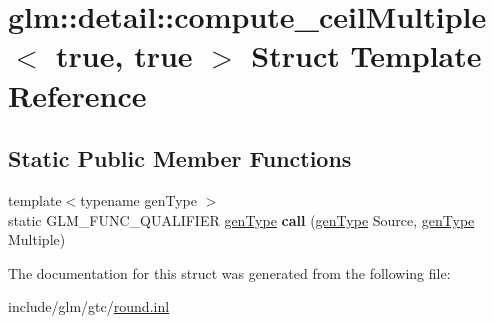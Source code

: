 \hypertarget{structglm_1_1detail_1_1compute__ceilMultiple_3_01true_00_01true_01_4}{}\section{glm\+:\+:detail\+:\+:compute\+\_\+ceil\+Multiple$<$ true, true $>$ Struct Template Reference}
\label{structglm_1_1detail_1_1compute__ceilMultiple_3_01true_00_01true_01_4}
\subsection*{Static Public Member Functions}
\begin{DoxyCompactItemize}
\item 
\mbox{\label{structglm_1_1detail_1_1compute__ceilMultiple_3_01true_00_01true_01_4_a6d9103207c947da13d0319d2d4d071d9}} 
{\footnotesize template$<$typename gen\+Type $>$ }\\static G\+L\+M\+\_\+\+F\+U\+N\+C\+\_\+\+Q\+U\+A\+L\+I\+F\+I\+ER \hyperlink{structglm_1_1detail_1_1genType}{gen\+Type} {\bfseries call} (\hyperlink{structglm_1_1detail_1_1genType}{gen\+Type} Source, \hyperlink{structglm_1_1detail_1_1genType}{gen\+Type} Multiple)
\end{DoxyCompactItemize}


The documentation for this struct was generated from the following file\+:\begin{DoxyCompactItemize}
\item 
include/glm/gtc/\hyperlink{round_8inl}{round.\+inl}\end{DoxyCompactItemize}
